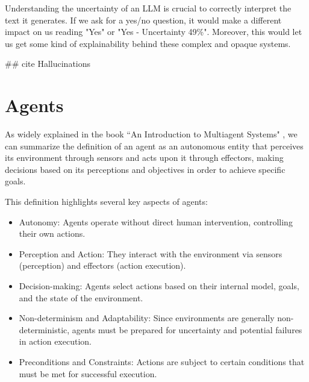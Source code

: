Understanding the uncertainty of an LLM is crucial to correctly interpret the text
it generates. If we ask for a yes/no question, it would make a different impact on
us reading "Yes" or "Yes - Uncertainty 49\%". Moreover, this would let us get
some kind of explainability behind these complex and opaque systems.

\#\# cite Hallucinations

\section{Agents}
\label{sec:agents}


As widely explained in the book ``An Introduction to Multiagent Systems" \cite{wooldridge2002multiagent},
we can summarize the definition of an agent as an autonomous entity that
perceives its environment through sensors and acts upon it through effectors, making
decisions based on its perceptions and objectives in order to achieve specific goals.

This definition highlights several key aspects of agents:
\begin{itemize}
  \item Autonomy: Agents operate without direct human intervention, controlling their
    own actions.

  \item Perception and Action: They interact with the environment via sensors (perception)
    and effectors (action execution).

  \item Decision-making: Agents select actions based on their internal model, goals,
    and the state of the environment.

  \item Non-determinism and Adaptability: Since environments are generally non-deterministic,
    agents must be prepared for uncertainty and potential failures in action execution.

  \item Preconditions and Constraints: Actions are subject to certain conditions
    that must be met for successful execution.
\end{itemize}

